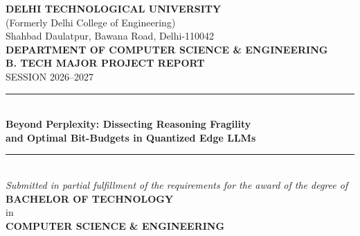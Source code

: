 \documentclass[12pt,a4paper,oneside]{report}
\begin{document}
\begin{titlepage}
\begin{center}
    {\large \textbf{DELHI TECHNOLOGICAL UNIVERSITY}}\\[0.2cm]
    {\normalsize (Formerly Delhi College of Engineering)}\\[0.2cm]
    {\normalsize Shahbad Daulatpur, Bawana Road, Delhi-110042}\\[0.6cm]

    {\large \textbf{DEPARTMENT OF COMPUTER SCIENCE \& ENGINEERING}}\\[1.2cm]

    {\Large \textbf{B. TECH MAJOR PROJECT REPORT}}\\[0.3cm]
    {\normalsize SESSION 2026--2027}\\[0.6cm]

    \rule{\linewidth}{1.2pt}\\[0.4cm]
    {\LARGE \textbf{Beyond Perplexity: Dissecting Reasoning Fragility}}\\[0.25cm]
    {\LARGE \textbf{and Optimal Bit-Budgets in Quantized Edge LLMs}}\\[0.3cm]
    \rule{\linewidth}{1.2pt}\\[1.0cm]

    \textit{Submitted in partial fulfillment of the requirements for the award of the degree of}\\[0.2cm]
    {\large \textbf{BACHELOR OF TECHNOLOGY}}\\[0.2cm]
    {\normalsize in}\\[0.2cm]
    {\large \textbf{COMPUTER SCIENCE \& ENGINEERING}}\\[1.0cm]


\end{center}
\end{titlepage}
\end{document}
